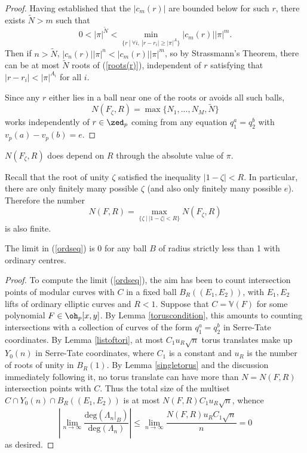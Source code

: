 \documentclass[12pt,letterpaper]{article}
\begin{document}
\begin{proof}
		Having established that the $|c_m(r)|$ are bounded below for such $r$, there exists $\tilde{N}>m$ such that \[0<|\pi|^{\tilde{N}}<\min_{\{r \ | \ \forall i,\ |r-r_i|\geq |\pi|^A \}} |c_{m}(r)| |\pi|^{m}.\] Then if $n>\tilde{N}$, $|c_n(r)||\pi|^n<|c_m(r)||\pi|^m$, so by Strassmann's Theorem, there can be at most $\tilde{N}$ roots of (\ref{roots(r)}), independent of $r$ satisfying that $|r-r_i|<|\pi|^{A_i}$ for all $i$.
		
		Since any $r$ either lies in a ball near one of the roots or avoids all such balls, \[N(F_\zeta,R) = \max\{N_1,...,N_M,\tilde{N}\}\] works independently of $r\in \zed_p$ coming from any equation $q_1^a=q_2^b$ with $v_p(a)-v_p(b)=e$.
	\end{proof}
	
	
	\begin{rem}
		$N(F_\zeta,R)$ does depend on $R$ through the absolute value of $\pi$.
	\end{rem}
	
	
	Recall that the root of unity $\zeta$ satisfied the inequality $|1-\zeta|<R$. In particular, there are only finitely many possible $\zeta$ (and also only finitely many possible $e$). Therefore the number\[N(F,R) = \max_{\{\zeta \ | \ |1-\zeta|<R\}}N(F_\zeta,R)\] is also finite.
	
	
	\begin{thm} \label{ThmOrd}
		The limit in (\ref{ordseq}) is 0 for any ball $B$ of radius strictly less than 1 with ordinary centres.
	\end{thm}
	
	\begin{proof}
		To compute the limit (\ref{ordseq}), the aim has been to count intersection points of modular curves with $C$ in a fixed ball $B_R((E_1,E_2))$, with $E_1,E_2$ lifts of ordinary elliptic curves and $R<1$. Suppose that $C = \mathbb{V}(F)$ for some polynomial $F\in \oh_p[x,y]$. By Lemma \ref{toruscondition}, this amounts to counting intersections with a collection of curves of the form $q_1^a=q_2^b$ in Serre-Tate coordinates. By Lemma \ref{listoftori}, at most $C_1u_R\sqrt{n}$ torus translates make up $Y_0(n)$ in Serre-Tate coordinates, where $C_1$ is a constant and $u_R$ is the number of roots of unity in $B_R(1)$. By Lemma \ref{singletorus} and the discussion immediately following it, no torus translate can have more than $N=N(F,R)$ intersection points with $C$. Thus the total size of the multiset $C\cap Y_0(n)\cap B_R((E_1,E_2))$ is at most $N(F,R)C_1u_R\sqrt{n}$, whence
		\[\left|\lim_{n\to\infty}\frac{\text{deg}(\Lambda_{n}|_B)}{\text{deg}(\Lambda_{n})}\right|\leq \lim_{n\to\infty}\frac{N(F,R)u_RC_1\sqrt{n}}{n}=0\]
		as desired.
	\end{proof}
	
\end{document}
